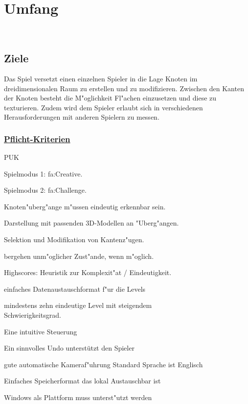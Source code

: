 %
%


\chapter{Umfang}
\label{UF}~\\


%
%
\section{Ziele}
\label{UF:Ziele}

Das Spiel versetzt einen einzelnen Spieler in die Lage Knoten im dreidimensionalen Raum zu erstellen und zu modifizieren. Zwischen den Kanten der Knoten besteht die M{"o}glichkeit Fl{"a}chen einzusetzen und diese zu texturieren. Zudem wird dem Spieler erlaubt sich in verschiedenen Herausforderungen mit anderen Spielern zu messen.\\

% 
%
\subsection*{\underline{Pflicht-Kriterien}}

\begin{ids}{\gls{PUK}}


		\id[10] Spielmodus 1: \gls{fa:Creative}.
		
		\id[20] Spielmodus 2: \gls{fa:Challenge}.
		
		\id[30] Knoten{"u}berg{"a}nge m{"u}ssen eindeutig erkennbar sein.
		
		\id[40] Darstellung mit passenden 3D-Modellen an {"U}berg{"a}ngen.
		
		\id[50] Selektion und Modifikation von Kantenz{"u}gen.
		
		bergehen unm{"o}glicher Zust{"a}nde, wenn m{"o}glich.
		
		\id[70] Highscores: Heuristik zur Komplexit{"a}t / Eindeutigkeit.
		
		\id[80] einfaches Datenaustauschformat f{"u}r die Levels
		
		\id[80] mindestens zehn eindeutige Level mit steigendem \\Schwierigkeitsgrad.
		
		\id[90] Eine intuitive Steuerung 
		
		\id[100] Ein sinnvolles Undo unterstützt den Spieler
		
		\id[110] gute automatische Kameraf{"u}hrung
		\id[120] Standard Sprache ist Englisch
		
	
		\id[130]  Einfaches Speicherformat das lokal Austauschbar ist
		
		\id[140] Windows als Plattform muss unterst{"u}tzt werden

\end{ids}

